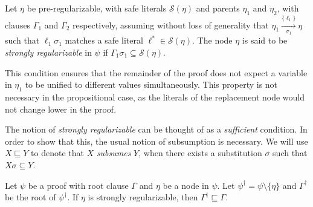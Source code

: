 \begin{definition} %
\label{prop:extracheck}
Let $\eta$ be pre-regularizable, with safe literals $\mathcal{S}(\eta)$ and parents $\eta_1$ and $\eta_2$, with clauses $\Gamma_1$ and $\Gamma_2$ respectively, assuming without loss of generality that $\eta_1 \xrightarrow[\sigma_1]{\{\ell_1\} } \eta$
such that $\ell_1\sigma_1$ matches a safe literal $\ell^*\in \mathcal{S}(\eta)$. 
The node $\eta$ is said to be \emph{strongly regularizable} in $\psi$ if $\Gamma_1 \sigma_{1} \subseteq \mathcal{S}(\eta)$.
\end{definition}

This condition ensures that the remainder of the proof does not expect a variable in $\eta_1$ to be unified to different values simultaneously. This property is not necessary in the propositional case, as the literals of the replacement node would not change lower in the proof. 



The notion of \emph{strongly regularizable} can be thought of as a \emph{sufficient} condition. In order to show that this, the usual notion of subsumption is necessary. We will use $X \sqsubseteq Y$ to denote that $X$ \emph{subsumes} $Y$, when there exists a substitution $\sigma$ such that $X\sigma \subseteq Y$.


\begin{thm}\label{thm:correct}
Let $\psi$ be a proof with root clause $\Gamma$ and $\eta$ be a node in $\psi$. Let $\psi^{\dagger} = \psi\setminus \{\eta\}$ and $\Gamma^{\dagger}$ be the root of $\psi^{\dagger}$. If $\eta$ is strongly regularizable, then $\Gamma^{\dagger} \sqsubseteq \Gamma$.
\end{thm}

